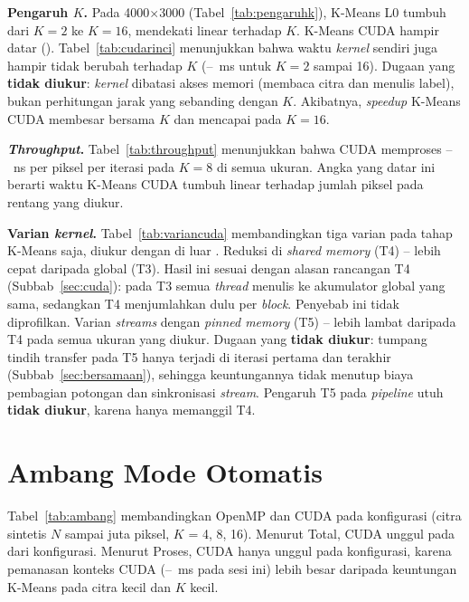 

\textbf{Pengaruh $K$.} Pada 4000$\times$3000 (Tabel~\ref{tab:pengaruhk}), K-Means L0 tumbuh \RasioKLo{} dari $K=2$ ke $K=16$, mendekati linear terhadap $K$. K-Means CUDA hampir datar (\RasioKCuda). Tabel~\ref{tab:cudarinci} menunjukkan bahwa waktu \emph{kernel} sendiri juga hampir tidak berubah terhadap $K$ (\KernelKMin--\KernelKMax~ms untuk $K=2$ sampai 16). Dugaan yang \textbf{tidak diukur}: \emph{kernel} dibatasi akses memori (membaca citra dan menulis label), bukan perhitungan jarak yang sebanding dengan $K$. Akibatnya, \emph{speedup} K-Means CUDA membesar bersama $K$ dan mencapai \LdSKMEnambelas{} pada $K=16$.



\textbf{\emph{Throughput}.} Tabel~\ref{tab:throughput} menunjukkan bahwa CUDA memproses \TpCudaMin--\TpCudaMax~ns per piksel per iterasi pada $K=8$ di semua ukuran. Angka yang datar ini berarti waktu K-Means CUDA tumbuh linear terhadap jumlah piksel pada rentang yang diukur.



\textbf{Varian \emph{kernel}.} Tabel~\ref{tab:variancuda} membandingkan tiga varian pada tahap K-Means saja, diukur dengan  di luar . Reduksi di \emph{shared memory} (T4) \TempatTigaMin--\TempatTigaMax{} lebih cepat daripada  global (T3). Hasil ini sesuai dengan alasan rancangan T4 (Subbab~\ref{sec:cuda}): pada T3 semua \emph{thread} menulis ke akumulator global yang sama, sedangkan T4 menjumlahkan dulu per \emph{block}. Penyebab ini tidak diprofilkan. Varian \emph{streams} dengan \emph{pinned memory} (T5) \LimaEmpatMin--\LimaEmpatMax{} lebih lambat daripada T4 pada semua ukuran yang diukur. Dugaan yang \textbf{tidak diukur}: tumpang tindih transfer pada T5 hanya terjadi di iterasi pertama dan terakhir (Subbab~\ref{sec:bersamaan}), sehingga keuntungannya tidak menutup biaya pembagian potongan dan sinkronisasi \emph{stream}. Pengaruh T5 pada \emph{pipeline} utuh \textbf{tidak diukur}, karena  hanya memanggil T4.



\section{Ambang Mode Otomatis}
\label{sec:hasilambang}
Tabel~\ref{tab:ambang} membandingkan OpenMP dan CUDA pada \AmbJumlah{} konfigurasi (citra sintetis $N$ sampai \AmbNMax{} juta piksel, $K$ = 4, 8, 16). Menurut Total, CUDA unggul pada \AmbCudaTotal{} dari \AmbJumlah{} konfigurasi. Menurut Proses, CUDA hanya unggul pada \AmbCudaProses{} konfigurasi, karena pemanasan konteks CUDA (\AmbWarmMin--\AmbWarmMax~ms pada sesi ini) lebih besar daripada keuntungan K-Means pada citra kecil dan $K$ kecil.

